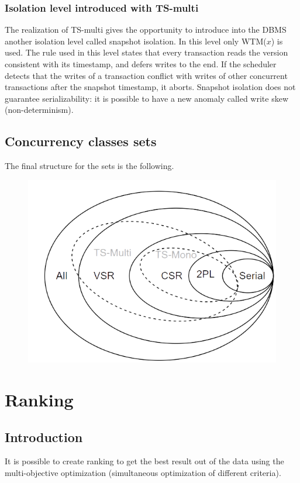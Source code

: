 \documentclass[12pt, a4paper]{report}
\newtheorem[style=M,bodystyle=\normalfont]{theorem}{Theorem}
\newtheorem[style=M,bodystyle=\normalfont]{corollary}{Corollary}
\newtheorem[style=M,bodystyle=\normalfont]{lemma}{Lemma}
\newtheorem[style=M,bodystyle=\normalfont]{definition}{Definition}
\begin{document}
    \subsection{Isolation level introduced with TS-multi}
    The realization of TS-multi gives the opportunity to introduce into the DBMS another isolation level called snapshot isolation. In this level only WTM($x$) is used. The rule 
    used in this level states that every transaction reads the version consistent with its timestamp, and defers writes to the end. If the scheduler detects that the writes of a
    transaction conflict with writes of other concurrent transactions after the snapshot timestamp, it aborts. Snapshot isolation does not guarantee serializability: it is possible 
    to have a new anomaly called write skew (non-determinism). 
    
    \section{Concurrency classes sets}
    The final structure for the sets is the following. 
    \begin{figure}[H]
        \centering
        \includegraphics[width=1\linewidth]{images/set.png}
    \end{figure}
    
\newpage 

\chapter{Ranking}
    \section{Introduction}
    It is possible to create ranking to get the best result out of the data using the multi-objective optimization (simultaneous optimization of different criteria). 
    
\end{document}
